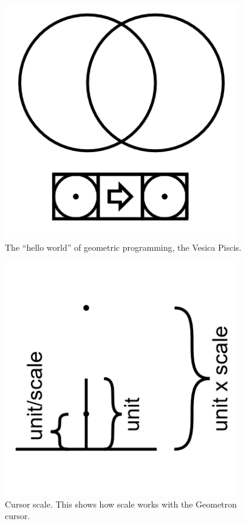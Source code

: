 \begin{figure}
	\centering
	\includegraphics[width=4in]{figures/web2d/vesicapiscis.png}
	\caption[vesicapiscis]
	{The ``hello world'' of geometric programming, the Vesica Piscis.}
\end{figure}
\begin{figure}
	\centering
	\includegraphics[width=4in]{figures/web2d/cursorscale1.png}
	\caption[cursorscale]
	{Cursor scale.  This shows how scale works with the Geometron cursor.}
\end{figure}
